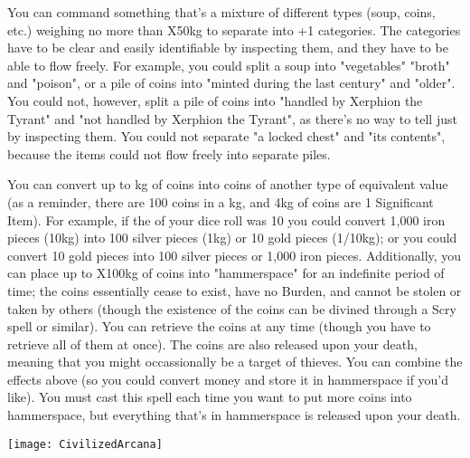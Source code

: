 {\MYSTERY [
  Name = Divvy,
  Link = arcana-mystery-divvy,
  Paradigm = Entropy,
  Save = N,
  Duration = Permanent,
  Target = Close Target(s)
]

You can command something that's a mixture of different types (soup, coins, etc.) weighing no more than \DICE X50kg to separate into \DICE+1 categories.  The categories have to be clear and easily identifiable by inspecting them, and they have to be able to flow freely.  For example, you could split a soup into "vegetables" "broth" and "poison", or a pile of coins into "minted during the last century" and "older". You could not, however, split a pile of coins into "handled by Xerphion the Tyrant" and "not handled by Xerphion the Tyrant", as there's no way to tell just by inspecting them. You could not separate "a locked chest" and "its contents", because the items could not flow freely into separate piles.


\MYSTERY [
  Name = Exchequer,
  Link = arcana-mystery-exchequer,
  Paradigm = Entropy,
  Save = N,
  Duration = Instant,
  Target = Close Target(s)
]

You can convert up to \SUMDICE kg of coins into coins of another type of equivalent value (as a reminder, there are 100 coins in a kg, and 4kg of coins are 1 Significant Item). For example, if the \SUMDICE of your dice roll was 10 you could convert 1,000 iron pieces (10kg) into 100 silver pieces (1kg) or 10 gold pieces (1/10kg); or you could convert 10 gold pieces into 100 silver pieces or 1,000 iron pieces. Additionally, you can place up to \DICE X100kg of coins into "hammerspace" for an indefinite period of time; the coins essentially cease to exist, have no Burden, and cannot be stolen or taken by others (though the existence of the coins can be divined through a Scry spell or similar).  You can retrieve the coins at any time (though you have to retrieve all of them at once).  The coins are also released upon your death, meaning that you might occassionally be a target of thieves.
You can combine the effects above (so you could convert money and store it in hammerspace if you'd like).  You must cast this spell each time you want to put more coins into hammerspace, but everything that's in hammerspace is released upon your death.

  \begin{center}
  \texttt{[image: CivilizedArcana]}
  \end{center}



\MYSTERY [
  Name = Forgehammer,
  Link = arcana-mystery-forgehammer,
  Paradigm = Force,
  Save = N,
  Duration = Session,
  Target = Self
]

}
